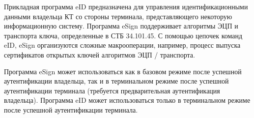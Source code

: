 Прикладная программа eID предназначена для управления идентификационными
данными владельца КТ со стороны терминала, представляющего некоторую 
информационную систему. 
%
Программа eSign поддерживает алгоритмы ЭЦП и транспорта ключа,
определенные в СТБ 34.101.45. С помощью цепочек команд eID, eSign
организуются сложные макрооперации, например, 
процесс выпуска сертификатов открытых ключей алгоритмов ЭЦП / транспорта.

Программа eSign может использоваться как в базовом режиме 
после успешной аутентификации владельца, так и в терминальном режиме 
после успешной аутентификации терминала (требуется предварительная 
аутентификация владельца). 
%
Программа eID может использоваться только в терминальном режиме
после успешной аутентификации терминала. 

\mbox{}


